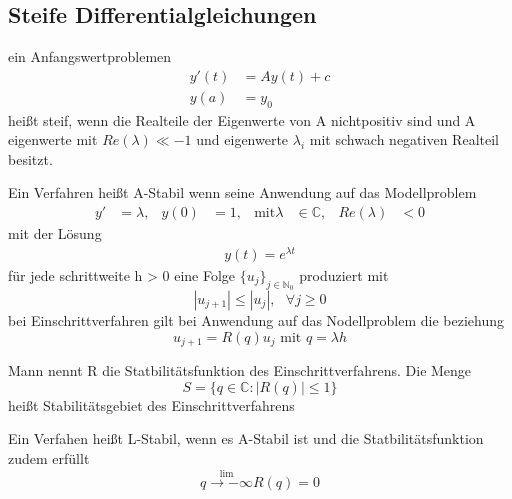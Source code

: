 \documentclass[
	ngerman,
	accentcolor=9c,%
	type=intern,
	marginpar=false
	]{tudapub}
\begin{document}
        \subsection{Steife Differentialgleichungen}
        \setcounter{satz}{1}
        \begin{definition}
            ein Anfangswertproblemen
            \begin{align*}
                y'(t) &= Ay(t)+c\\
                y(a) &= y_0
            \end{align*}
            heißt steif, wenn die Realteile der Eigenwerte von A nichtpositiv sind und A eigenwerte mit $Re(\lambda) \ll -1$
            und eigenwerte $\lambda_i$ mit schwach negativen Realteil besitzt. 
        \end{definition}
        \begin{definition}
            Ein Verfahren heißt A-Stabil wenn seine Anwendung auf das Modellproblem
            \begin{align*}
                y' &= \lambda, & y(0) &= 1, & \text{mit} \lambda &\in \mathbb{C}, & Re(\lambda)&<0
            \end{align*}
            mit der Lösung
            \begin{align*}
                y(t) = e^{\lambda t}
            \end{align*}
            für jede schrittweite h > 0 eine Folge $\{u_j\}_{j\in\mathbb{N}_0}$ produziert mit
            \begin{equation*}
                |u_{j+1}| \leq |u_j|, \mbox{    }\forall j \geq 0
            \end{equation*}
            bei Einschrittverfahren gilt bei Anwendung auf das Nodellproblem die beziehung 
            \begin{equation*}
                u_{j+1} = R(q) u_j \mbox{ mit } q = \lambda h
            \end{equation*}
        \end{definition}
        \setcounter{satz}{4}
        \begin{definition}
            Mann nennt R die Statbilitätsfunktion des Einschrittverfahrens. Die Menge
            \begin{equation*}
                S = \{q \in \mathbb{C} : |R(q)| \leq 1\}
            \end{equation*}
            heißt Stabilitätsgebiet des Einschrittverfahrens
        \end{definition}
        \begin{definition}
            Ein Verfahen heißt L-Stabil, wenn es A-Stabil ist und die Statbilitätsfunktion zudem erfüllt
            \begin{equation*}
                \stackrel{\lim}{q \rightarrow - \infty} R(q) = 0
            \end{equation*}
        \end{definition}
\end{document}
